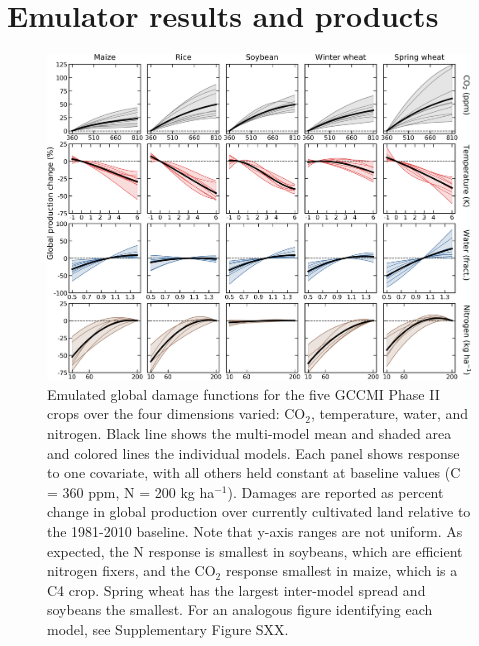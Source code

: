 \documentclass[gmd, manuscript]{copernicus} %
\begin{document}
\section{Emulator results and products}
\label{S:5}
\begin{figure}[ht]
  \centering
  \includegraphics[width = 16.3cm]{figures/em_CTWN_all_crops.png}
  \caption{
  Emulated global damage functions for the five GCCMI Phase II crops over the four dimensions varied: CO$_2$, temperature, water, and nitrogen.
  Black line shows the multi-model mean and shaded area and colored lines the individual models. 
  Each panel shows response to one covariate, with all others held constant at baseline values (C = 360 ppm, N = 200 kg ha$^{-1}$). 
  Damages are reported as percent change in global production over currently cultivated land relative to the 1981-2010 baseline. Note that y-axis ranges are not uniform.
  As expected, the N response is smallest in soybeans, which are efficient nitrogen fixers, and the CO$_2$ response smallest in maize, which is a C4 crop. Spring wheat has the largest inter-model spread and soybeans the smallest. For an analogous figure identifying each model, see Supplementary Figure SXX.
  }
  \label{fig:all_dims}
\end{figure}
\end{document}
